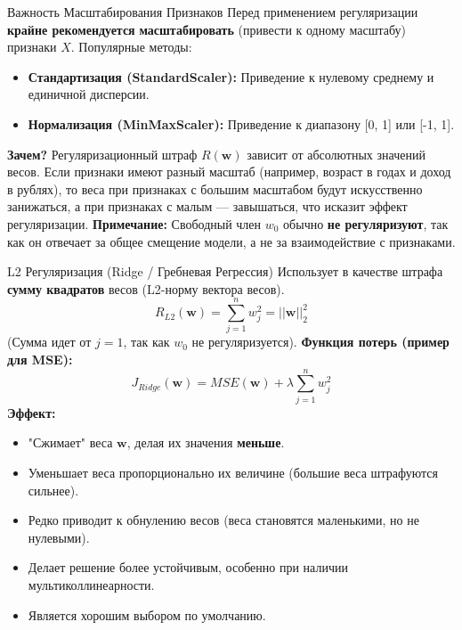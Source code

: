\begin{myblock}{Важность Масштабирования Признаков}
    Перед применением регуляризации \textbf{крайне рекомендуется} \textbf{масштабировать} (привести к одному масштабу) признаки $X$. Популярные методы:
    \begin{itemize}[nosep, leftmargin=*]
        \item \textbf{Стандартизация (StandardScaler):} Приведение к нулевому среднему и единичной дисперсии.
        \item \textbf{Нормализация (MinMaxScaler):} Приведение к диапазону [0, 1] или [-1, 1].
    \end{itemize}
    \textbf{Зачем?} Регуляризационный штраф $R(\mathbf{w})$ зависит от абсолютных значений весов. Если признаки имеют разный масштаб (например, возраст в годах и доход в рублях), то веса при признаках с большим масштабом будут искусственно занижаться, а при признаках с малым — завышаться, что исказит эффект регуляризации.
    \textbf{Примечание:} Свободный член $w_0$ обычно \textbf{не регуляризуют}, так как он отвечает за общее смещение модели, а не за взаимодействие с признаками.
\end{myblock}

\begin{myblock}{L2 Регуляризация (Ridge / Гребневая Регрессия)}
    Использует в качестве штрафа \textbf{сумму квадратов} весов (L2-норму вектора весов).
    \[ R_{L2}(\mathbf{w}) = \sum_{j=1}^{n} w_j^2 = ||\mathbf{w}||_2^2 \]
    (Сумма идет от $j=1$, так как $w_0$ не регуляризуется).
    \textbf{Функция потерь (пример для MSE):}
    \[ J_{Ridge}(\mathbf{w}) = MSE(\mathbf{w}) + \lambda \sum_{j=1}^{n} w_j^2 \]
    \textbf{Эффект:}
    \begin{itemize}[nosep, leftmargin=*]
        \item "Сжимает" веса $\mathbf{w}$, делая их значения \textbf{меньше}.
        \item Уменьшает веса пропорционально их величине (большие веса штрафуются сильнее).
        \item Редко приводит к обнулению весов (веса становятся маленькими, но не нулевыми).
        \item Делает решение более устойчивым, особенно при наличии мультиколлинеарности.
        \item Является хорошим выбором по умолчанию.
    \end{itemize}
\end{myblock}

